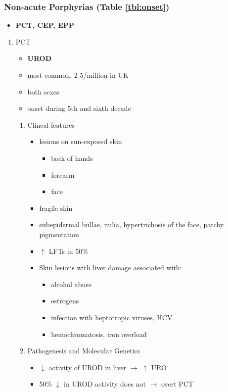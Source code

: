 \documentclass{scrartcl}
\begin{document}
\subsubsection{Non-acute Porphyrias (Table \ref{tbl:onset})}
\label{sec:org1d8f068}
\begin{itemize}
\item \textbf{PCT, CEP, EPP}
\end{itemize}
\begin{enumerate}
\item PCT
\label{sec:org23d458c}
\begin{itemize}
\item \textbf{UROD}
\item most common, 2-5/million in UK
\item both sexes
\item onset during 5th and sixth decade
\end{itemize}
\begin{enumerate}
\item Clincal features
\label{sec:org51ce30e}
\begin{itemize}
\item lesions on sun-exposed skin
\begin{itemize}
\item back of hands
\item forearm
\item face
\end{itemize}
\item fragile skin
\item subepidermal bullae, milia, hypertrichosis of the face, patchy pigmentation
\item \(\uparrow\) LFTs in 50\%
\item Skin lesions with liver damage associated with:
\begin{itemize}
\item alcohol abuse
\item estrogens
\item infection with heptotropic viruses, HCV
\item hemochromatosis, iron overload
\end{itemize}
\end{itemize}
\item Pathogenesis and Molecular Genetics
\label{sec:orgecb5f86}
\begin{itemize}
\item \(\downarrow\) activity of UROD in liver \(\to\) \(\uparrow\) URO
\item 50\% \(\downarrow\) in UROD activity does not \(\to\) overt PCT

\end{itemize}
\end{enumerate}
\end{enumerate}
\end{document}
